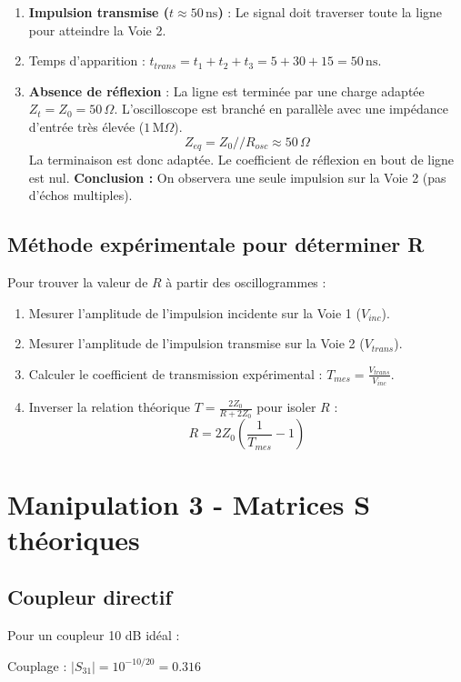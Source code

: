 \documentclass[12pt,a4paper]{article}
\begin{document}
\begin{enumerate}
    \item \textbf{Impulsion transmise ($t \approx 50\,\text{ns}$)} :
    Le signal doit traverser toute la ligne pour atteindre la Voie 2.
    \item Temps d'apparition : $t_{trans} = t_1 + t_2 + t_3 = 5 + 30 + 15 = 50\,\text{ns}$.
    \item \textbf{Absence de réflexion} :
    La ligne est terminée par une charge adaptée $Z_t = Z_0 = 50\,\Omega$. L'oscilloscope est branché en parallèle avec une impédance d'entrée très élevée ($1\,\text{M}\Omega$).
    $$Z_{eq} = Z_0 // R_{osc} \approx 50\,\Omega$$
    La terminaison est donc adaptée. Le coefficient de réflexion en bout de ligne est nul.
    \textbf{Conclusion :} On observera une seule impulsion sur la Voie 2 (pas d'échos multiples).
\end{enumerate}

\subsection{Méthode expérimentale pour déterminer R}
Pour trouver la valeur de $R$ à partir des oscillogrammes :
\begin{enumerate}
    \item Mesurer l'amplitude de l'impulsion incidente sur la Voie 1 ($V_{inc}$).
    \item Mesurer l'amplitude de l'impulsion transmise sur la Voie 2 ($V_{trans}$).
    \item Calculer le coefficient de transmission expérimental : $T_{mes} = \frac{V_{trans}}{V_{inc}}$.
    \item Inverser la relation théorique $T = \frac{2Z_0}{R + 2Z_0}$ pour isoler $R$ :
    $$R = 2Z_0 \left( \frac{1}{T_{mes}} - 1 \right)$$
\end{enumerate}

\section{Manipulation 3 - Matrices S théoriques}

\subsection{Coupleur directif}

Pour un coupleur 10 dB idéal :

Couplage : $|S_{31}| = 10^{-10/20} = 0.316$
\end{document}
